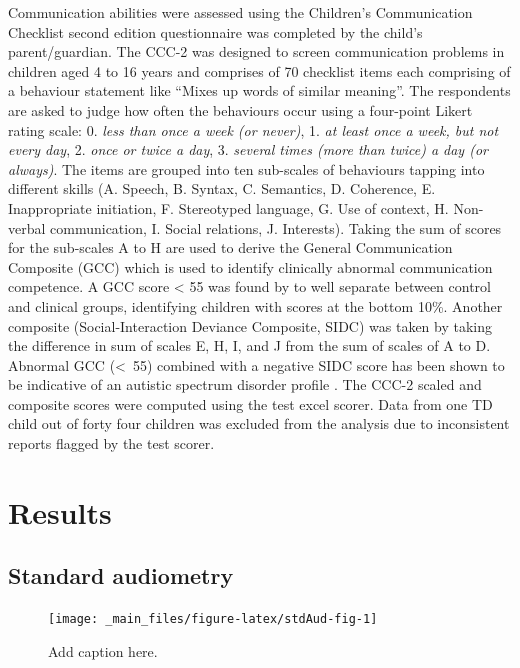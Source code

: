 \documentclass[a4paper, twoside]{templates/ociamthesis}
\begin{document}
Communication abilities were assessed using the Children's Communication Checklist second edition questionnaire \autocite[CCC-2;][]{D.V.M.2003} was completed by the child's parent/guardian. The CCC-2 was designed to screen communication problems in children aged 4 to 16 years and comprises of 70 checklist items each comprising of a behaviour statement like ``Mixes up words of similar meaning''. The respondents are asked to judge how often the behaviours occur using a four-point Likert rating scale: 0. \emph{less than once a week (or never)}, 1. \emph{at least once a week, but not every day}, 2. \emph{once or twice a day}, 3. \emph{several times (more than twice) a day (or always)}. The items are grouped into ten sub-scales of behaviours tapping into different skills (A. Speech, B. Syntax, C. Semantics, D. Coherence, E. Inappropriate initiation, F. Stereotyped language, G. Use of context, H. Non-verbal communication, I. Social relations, J. Interests). Taking the sum of scores for the sub-scales A to H are used to derive the General Communication Composite (GCC) which is used to identify clinically abnormal communication competence. A GCC score \textless{} 55 was found by \textcite{Norbury2005} to well separate between control and clinical groups, identifying children with scores at the bottom 10\%. Another composite (Social-Interaction Deviance Composite, SIDC) was taken by taking the difference in sum of scales E, H, I, and J from the sum of scales of A to D. Abnormal GCC (\textless~55) combined with a negative SIDC score has been shown to be indicative of an autistic spectrum disorder profile \autocite{D.V.M.2003}. The CCC-2 scaled and composite scores were computed using the test excel scorer. Data from one TD child out of forty four children was excluded from the analysis due to inconsistent reports flagged by the test scorer.

\hypertarget{results-3}{%
\section{Results}\label{results-3}}

\hypertarget{standard-audiometry-1}{%
\subsection{Standard audiometry}\label{standard-audiometry-1}}

\begin{figure}

{\centering \texttt{[image: \_main\_files/figure-latex/stdAud-fig-1]} 

}

\caption{Add caption here.}\label{fig:stdAud-fig}
\end{figure}
\end{document}
